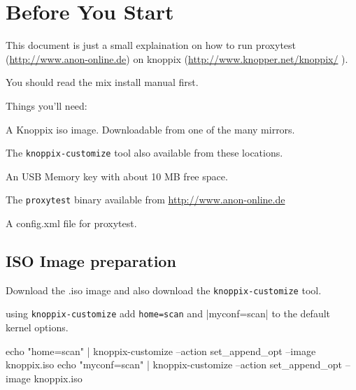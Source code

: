 \documentclass{article}
\begin{document}



\section{Before You Start}


This document is just a small explaination on how to run proxytest
(\url{http://www.anon-online.de}) on knoppix
(\url{http://www.knopper.net/knoppix/} ).

You should read the mix install manual first.


Things you'll need:

A Knoppix iso image. Downloadable from one of the many mirrors.

The \verb|knoppix-customize| tool also available from these locations.

An USB Memory key with about 10 MB free space.

The \verb|proxytest| binary available from \url{http://www.anon-online.de}

A config.xml file for proxytest.



\subsection{ISO Image preparation}


Download the .iso image and also download the \verb|knoppix-customize| tool.

using \verb|knoppix-customize| add \verb|home=scan| and \berb|myconf=scan|
to the default kernel options.

\begin{verbose}

echo "home=scan" | knoppix-customize --action set_append_opt --image knoppix.iso 
echo "myconf=scan" | knoppix-customize --action set_append_opt --image knoppix.iso 

\end{verbose}
\end{document}
